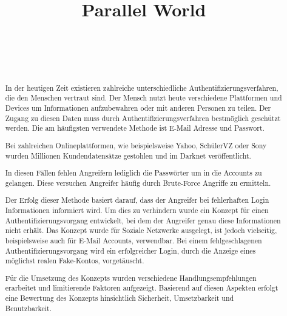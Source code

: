 \documentclass{sigchi}
\def\plaintitle{Parallel World}
\begin{document}
\title{\plaintitle}

\author{%
  \\
  \\
  \\
}

\maketitle

\begin{abstract}
In der heutigen Zeit existieren zahlreiche unterschiedliche Authentifizierungsverfahren, die den Menschen vertraut sind. Der Mensch nutzt heute verschiedene Plattformen und Devices um Informationen aufzubewahren oder mit anderen Personen zu teilen. Der Zugang zu diesen Daten muss durch Authentifizierungsverfahren bestmöglich geschützt werden. Die am häufigsten verwendete Methode ist E-Mail Adresse und Passwort.\cite{passwordsCommon}

Bei zahlreichen Onlineplattformen, wie beispielsweise Yahoo, SchülerVZ oder Sony wurden Millionen Kundendatensätze gestohlen und im Darknet veröffentlicht.\cite{darknetYahoo}

In diesen Fällen fehlen Angreifern lediglich die Passwörter um in die Accounts zu gelangen. Diese versuchen Angreifer häufig durch Brute-Force Angriffe zu ermitteln.\cite{bruteForce}

Der Erfolg dieser Methode basiert darauf, dass der Angreifer bei fehlerhaften Login Informationen informiert wird. Um dies zu verhindern wurde ein Konzept für einen Authentifizierungsvorgang entwickelt, bei dem der Angreifer genau diese Informationen nicht erhält. Das Konzept wurde für Soziale Netzwerke ausgelegt, ist jedoch vielseitig, beispielsweise auch für E-Mail Accounts, verwendbar. Bei einem fehlgeschlagenen Authentifizierungsvorgang wird ein erfolgreicher Login, durch die Anzeige eines möglichst realen Fake-Kontos, vorgetäuscht.

Für die Umsetzung des Konzepts wurden verschiedene Handlungsempfehlungen erarbeitet und limitierende Faktoren aufgezeigt. Basierend auf diesen Aspekten erfolgt eine Bewertung des Konzepts hinsichtlich Sicherheit, Umsetzbarkeit und Benutzbarkeit. 
\end{abstract}
\end{document}
